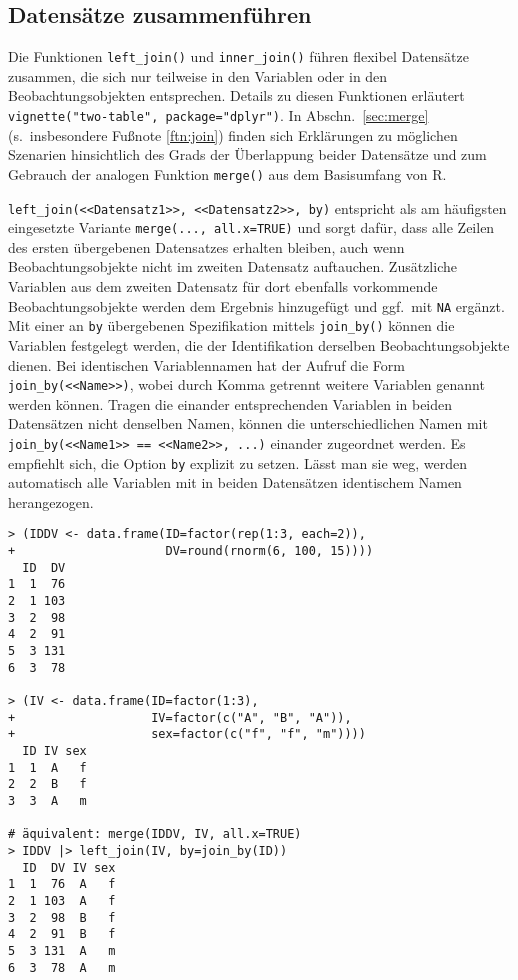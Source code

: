\subsection{Datensätze zusammenführen}
\label{sec:dplyr_merge}

Die Funktionen \lstinline!left_join()! und \lstinline!inner_join()! führen flexibel Datensätze zusammen, die sich nur teilweise in den Variablen oder in den Beobachtungsobjekten entsprechen. Details zu diesen Funktionen erläutert \lstinline!vignette("two-table", package="dplyr")!. In Abschn.\ \ref{sec:merge} (s.\ insbesondere Fußnote \ref{ftn:join}) finden sich Erklärungen zu möglichen Szenarien hinsichtlich des Grads der Überlappung beider Datensätze und zum Gebrauch der analogen Funktion \lstinline!merge()! aus dem Basisumfang von R.

\lstinline!left_join(<<Datensatz1>>, <<Datensatz2>>, by)! entspricht als am häufigsten eingesetzte Variante \lstinline!merge(..., all.x=TRUE)! und sorgt dafür, dass alle Zeilen des ersten übergebenen Datensatzes erhalten bleiben, auch wenn Beobachtungsobjekte nicht im zweiten Datensatz auftauchen. Zusätzliche Variablen aus dem zweiten Datensatz für dort ebenfalls vorkommende Beobachtungsobjekte werden dem Ergebnis hinzugefügt und ggf.\ mit \lstinline!NA! ergänzt. Mit einer an \lstinline!by! übergebenen Spezifikation mittels \lstinline!join_by()! können die Variablen festgelegt werden, die der Identifikation derselben Beobachtungsobjekte dienen. Bei identischen Variablennamen hat der Aufruf die Form \lstinline!join_by(<<Name>>)!, wobei durch Komma getrennt weitere Variablen genannt werden können. Tragen die einander entsprechenden Variablen in beiden Datensätzen nicht denselben Namen, können die unterschiedlichen Namen mit \lstinline!join_by(<<Name1>> == <<Name2>>, ...)! einander zugeordnet werden. Es empfiehlt sich, die Option \lstinline!by! explizit zu setzen. Lässt man sie weg, werden automatisch alle Variablen mit in beiden Datensätzen identischem Namen herangezogen.
\begin{lstlisting}
> (IDDV <- data.frame(ID=factor(rep(1:3, each=2)),
+                     DV=round(rnorm(6, 100, 15))))
  ID  DV
1  1  76
2  1 103
3  2  98
4  2  91
5  3 131
6  3  78

> (IV <- data.frame(ID=factor(1:3),
+                   IV=factor(c("A", "B", "A")),
+                   sex=factor(c("f", "f", "m"))))
  ID IV sex
1  1  A   f
2  2  B   f
3  3  A   m

# äquivalent: merge(IDDV, IV, all.x=TRUE)
> IDDV |> left_join(IV, by=join_by(ID))
  ID  DV IV sex
1  1  76  A   f
2  1 103  A   f
3  2  98  B   f
4  2  91  B   f
5  3 131  A   m
6  3  78  A   m
\end{lstlisting}

